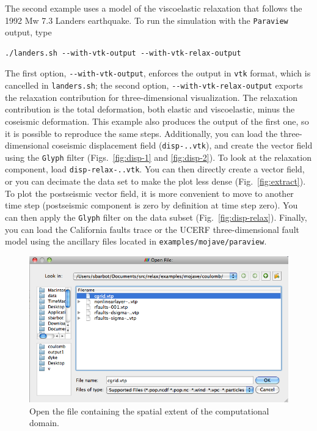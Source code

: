 \documentclass[10pt]{article}
\begin{document}
The second example uses a model of the viscoelastic relaxation that follows the 1992 Mw 7.3 Landers earthquake. To run the simulation with the \verb`Paraview` output, type
\begin{verbatim}
./landers.sh --with-vtk-output --with-vtk-relax-output
\end{verbatim}
The first option, \verb`--with-vtk-output`, enforces the output in \verb`vtk` format, which is cancelled in \verb`landers.sh`; the second option, \verb`--with-vtk-relax-output` exports the relaxation contribution for three-dimensional visualization. The relaxation contribution is the total deformation, both elastic and viscoelastic, minus the coseismic deformation. This example also produces the output of the first one, so it is possible to reproduce the same steps. Additionally, you can load the three-dimensional coseismic displacement field (\verb`disp-..vtk`), and create the vector field using the \verb`Glyph` filter (Figs.~\ref{fig:disp-1} and \ref{fig:disp-2}). To look at the relaxation component, load \verb`disp-relax-..vtk`. You can then directly create a vector field, or you can decimate the data set to make the plot less dense (Fig.~\ref{fig:extract}). To plot the postseismic vector field, it is more convenient to move to another time step (postseismic component is zero by definition at time step zero). You can then apply the \verb`Glyph` filter on the data subset (Fig.~\ref{fig:disp-relax}). Finally, you can load the California faults trace or the UCERF three-dimensional fault model using the ancillary files located in \verb`examples/mojave/paraview`.



%
\begin{figure}
\begin{center}
\includegraphics[width=\textwidth]{paraview-cgrid-1.png}
\end{center}
\small
\caption{Open the file containing the spatial extent of the computational domain.}
\label{fig:cgrid-1}
\end{figure}
%
\end{document}
